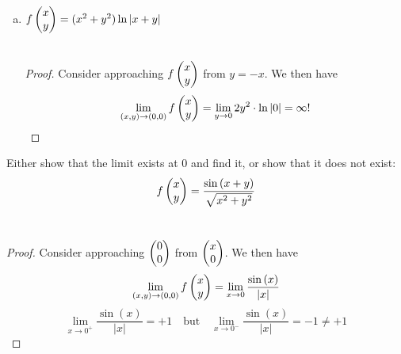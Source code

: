 \begin{enumerate}[a.]
  \item $f\begin{pmatrix} x \\ y \end{pmatrix} = (x^2 + y^2) \ln{|x+y|}$ \\
   \\
  \begin{proof}
    Consider approaching $f\begin{pmatrix} x \\ y \end{pmatrix}$ from $y = -x$. We then have
    \[\lim_{(x,y)\rightarrow (0,0)}f\begin{pmatrix} x \\ y \end{pmatrix} = \lim_{y\rightarrow 0} 2y^2\cdot \ln{|0|} = \infty !\]
  \end{proof}
  \end{enumerate}

 Either show that the limit exists at $0$ and find it, or show that it does not exist:
\[f\begin{pmatrix} x \\ y \end{pmatrix} = \frac{\sin{(x+y)}}{\sqrt{x^2+y^2}}\]
 \\
\begin{proof}
  Consider approaching $\begin{pmatrix} 0 \\ 0 \end{pmatrix}$ from $\begin{pmatrix} x \\ 0 \end{pmatrix}$. We then have
  \[\lim_{(x,y)\rightarrow (0,0)}f\begin{pmatrix} x \\ y \end{pmatrix} = \lim_{x\rightarrow 0} \frac{\sin{(x)}}{|x|}\]
  \[\lim_{x\rightarrow 0^+} \frac{\sin{(x)}}{|x|} = +1 \quad \text{but} \quad \lim_{x\rightarrow 0^-} \frac{\sin{(x)}}{|x|} = -1 \neq +1\]
  \end{proof}